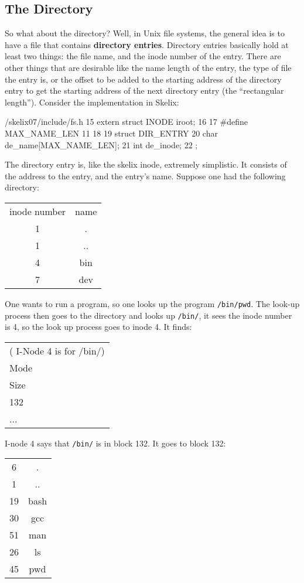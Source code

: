 \documentclass{article}
\begin{document}
\subsection{The Directory}

So what about the directory? Well, in Unix file systems, the general idea is to have a file that contains \textbf{directory entries}. Directory entries basically hold at least two things: 
the file name, 
and the inode number of the entry. 
There are other things that are desirable like the name length of the entry, the type of file the entry is, or the offset to be added to the starting address of the directory entry to get the starting address of the next directory entry (the ``rectangular length''). Consider the implementation in Skelix:


\begin{code}{/skelix07/include/fs.h}
15 extern struct INODE iroot;
16 
17 #define MAX_NAME_LEN 11
18 
19 struct DIR_ENTRY {
20      char de_name[MAX_NAME_LEN];
21      int de_inode;
22 };
\end{code}
The directory entry is, like the skelix inode, extremely simplistic. It consists of the address to the entry, and the entry's name. Suppose one had the following directory:

\begin{tabular}{cc}
 \textrm{inode number} & \textrm{name} \\
 1  & . \\
 1 & .. \\
 4 & \textrm{bin} \\
 7 & \textrm{dev} 
\end{tabular}

One wants to run a program, so one looks up the program \verb|/bin/pwd|. The look-up process then goes to the directory and looks up \verb|/bin/|, it sees the inode number is 4, so the look up process goes to inode 4. It finds:

\begin{tabular}{l} \\
(\textrm{ I-Node 4 is for /bin/}) \\
\textrm{Mode} \\
\textrm{Size} \\
132 \\
...
\end{tabular}

I-node 4 says that \verb|/bin/| is in block 132. It goes to block 132:

\begin{tabular}{cc}
 6 & . \\
 1 & .. \\
 19 & \textrm{bash} \\
 30 & \textrm{gcc} \\
 51 & \textrm{man} \\
 26 & \textrm{ls} \\
 45 & \textrm{pwd} 
\end{tabular}
\end{document}
